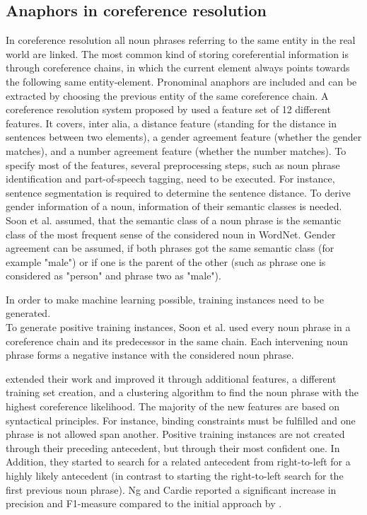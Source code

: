 \subsection{Anaphors in coreference resolution}
\label{soon2001traininginstances}
In coreference resolution all noun phrases referring to the same entity in the real world are linked. The most common kind of storing coreferential information is through coreference chains, in which the current element always points towards the following same entity-element. Pronominal anaphors are included and can be extracted by choosing the previous entity of the same coreference chain. 
A coreference resolution system proposed by \citep{soon2001machine} used a feature set of 12 different features. It covers, inter alia, a distance feature (standing for the distance in sentences between two elements), a gender agreement feature (whether the gender matches), and a number agreement feature (whether the number matches). To specify most of the features, several preprocessing steps, such as noun phrase identification and part-of-speech tagging,  need to be executed. For instance, sentence segmentation is required to determine the sentence distance. To derive gender information of a noun, information of their semantic classes is needed. Soon et al. assumed, that the semantic class of a noun phrase is the semantic class of the most frequent sense of the considered noun in WordNet. Gender agreement can be assumed, if both phrases got the same semantic class (for example "male") or if one is the parent of the other (such as phrase one is considered as "person" and phrase two as "male").

In order to make machine learning possible, training instances need to be generated.\\
To generate positive training instances, Soon et al. used every noun phrase in a coreference chain and its predecessor in the same chain. Each intervening noun phrase forms a negative instance with the considered noun phrase. 


\citep{ng2002improving} extended their work and improved it through additional features, a different training set creation, and a clustering algorithm to find the noun phrase with the highest coreference likelihood. The majority of the new features are based on syntactical principles. For instance, binding constraints must be fulfilled and one phrase is not allowed span another. Positive training instances are not created through their preceding antecedent, but through their most confident one. In Addition, they started to search for a related antecedent from right-to-left for a highly likely antecedent (in contrast to starting the right-to-left search for the first previous noun phrase). Ng and Cardie reported a significant increase in precision and F1-measure compared to the initial approach by \citep{soon2001machine}.

